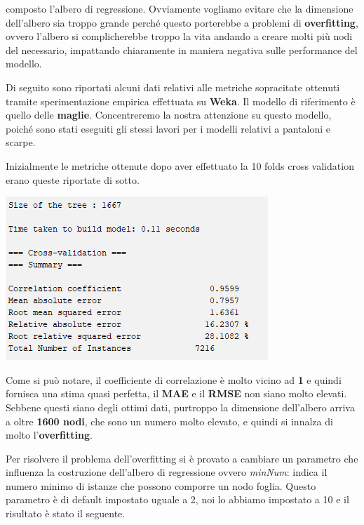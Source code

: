 \documentclass[a4paper, 11pt, oneside]{report}
\begin{document}
                composto l'albero di regressione.
                Ovviamente vogliamo evitare che la dimensione dell'albero sia troppo grande perché questo porterebbe a problemi
                di \textbf{overfitting}, ovvero l'albero si complicherebbe troppo la vita andando a creare molti più nodi
                del necessario, impattando chiaramente in maniera negativa sulle performance del modello.
                \\
                \par \noindent Di seguito sono riportati alcuni dati relativi alle metriche sopracitate ottenuti tramite
                sperimentazione empirica effettuata su \textbf{Weka}.
                Il modello di riferimento è quello delle \textbf{maglie}. Concentreremo la nostra attenzione su questo
                modello, poiché sono stati eseguiti gli stessi lavori per i modelli relativi a pantaloni e scarpe.
                \newpage
                \par \noindent Inizialmente le metriche ottenute dopo aver effettuato la 10 folds cross validation
                erano queste riportate di sotto.

                \begin{center}
                    \includegraphics[scale=0.8]{metricheIniziali}
                \end{center}
                \par \noindent Come si può notare, il coefficiente di correlazione è molto vicino ad \textbf{1} e quindi
                fornisca una stima quasi perfetta, il \textbf{MAE} e il \textbf{RMSE} non siano molto elevati.
                Sebbene questi siano degli ottimi dati, purtroppo la dimensione dell'albero arriva a oltre \textbf{1600 nodi}, che
                sono un numero molto elevato, e quindi si innalza di molto l'\textbf{overfitting}.
                \\
                \par \noindent Per risolvere il problema dell'overfitting si è provato a cambiare un parametro che influenza la costruzione dell'albero
                di regressione ovvero \textit{minNum}: indica il numero minimo di istanze che possono comporre un nodo
                foglia.
                Questo parametro è di default impostato uguale a 2, noi lo abbiamo impostato a 10 e il risultato è stato il seguente.
\end{document}
